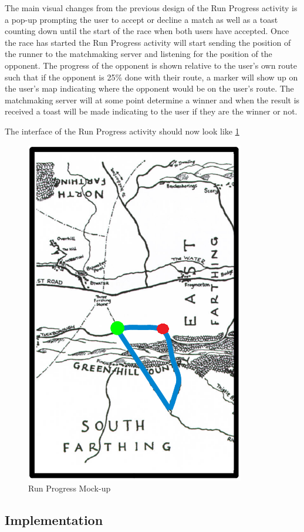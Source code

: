 The main visual changes from the previous design of the Run Progress activity is a pop-up prompting the user to accept or decline a match as well as a toast counting down until the start of the race when both users have accepted. Once the race has started the Run Progress activity will start sending the position of the runner to the matchmaking server and listening for the position of the opponent. The progress of the opponent is shown relative to the user's own route such that if the opponent is 25\% done with their route, a marker will show up on the user's map indicating where the opponent would be on the user's route. The matchmaking server will at some point determine a winner and when the result is received a toast will be made indicating to the user if they are the winner or not.

The interface of the Run Progress activity should now look like \ref{fig:mapMockV2}

\begin{figure}[ht]
\begin{center}
 \caption{Run Progress Mock-up}
 \label{fig:mapMockV2}
 \includegraphics[scale=0.4]{img/mapMockV2.png}
\end{center}
\end{figure}

\subsection{Implementation}
